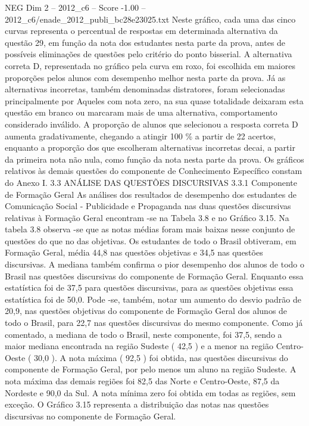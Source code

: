 \begin{textsample}{NEG Dim 2 – 2012\_c6 – Score -1.00 – 2012\_c6/enade\_2012\_publi\_bc28e23025.txt}
Neste gráfico, cada uma das cinco curvas representa o percentual de respostas em determinada alternativa da questão 29, em função da nota dos estudantes nesta parte da prova, antes de possíveis eliminações de questões pelo critério do ponto bisserial.
A alternativa correta D, representada no gráfico pela curva em roxo, foi escolhida em maiores proporções pelos alunos com desempenho melhor nesta parte da prova.
Já as alternativas incorretas, também denominadas distratores, foram selecionadas principalmente por Aqueles com nota zero, na sua quase totalidade deixaram esta questão em branco ou marcaram mais de uma alternativa, comportamento considerado inválido.
A proporção de alunos que selecionou a resposta correta D aumenta gradativamente, chegando a atingir 100 \% a partir de 22 acertos, enquanto a proporção dos que escolheram alternativas incorretas decai, a partir da primeira nota não nula, como função da nota nesta parte da prova.
Os gráficos relativos às demais questões do componente de Conhecimento Específico constam do Anexo I. 3.3 ANÁLISE DAS QUESTÕES DISCURSIVAS 3.3.1 Componente de Formação Geral As análises dos resultados de desempenho dos estudantes de Comunicação Social - Publicidade e Propaganda nas duas questões discursivas relativas à Formação Geral encontram -se na Tabela 3.8 e no Gráfico 3.15.
Na tabela 3.8 observa -se que as notas médias foram mais baixas nesse conjunto de questões do que no das objetivas.
Os estudantes de todo o Brasil obtiveram, em Formação Geral, média 44,8 nas questões objetivas e 34,5 nas questões discursivas.
A mediana também confirma o pior desempenho dos alunos de todo o Brasil nas questões discursivas do componente de Formação Geral.
Enquanto essa estatística foi de 37,5 para questões discursivas, para as questões objetivas essa estatística foi de 50,0.
Pode -se, também, notar um aumento do desvio padrão de 20,9, nas questões objetivas do componente de Formação Geral dos alunos de todo o Brasil, para 22,7 nas questões discursivas do mesmo componente.
Como já comentado, a mediana de todo o Brasil, neste componente, foi 37,5, sendo a maior mediana encontrada na região Sudeste ( 42,5 ) e a menor na região Centro-Oeste ( 30,0 ).
A nota máxima ( 92,5 ) foi obtida, nas questões discursivas do componente de Formação Geral, por pelo menos um aluno na região Sudeste.
A nota máxima das demais regiões foi 82,5 das Norte e Centro-Oeste, 87,5 da Nordeste e 90,0 da Sul.
A nota mínima zero foi obtida em todas as regiões, sem exceção.
O Gráfico 3.15 representa a distribuição das notas nas questões discursivas no componente de Formação Geral.

\end{textsample}
